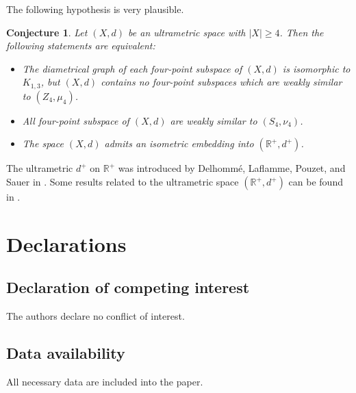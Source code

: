 \documentclass[11pt]{article}
\newtheorem{conjecture}[theorem]{Conjecture}
\theoremstyle{definition}
\theoremstyle{remark}
\numberwithin{equation}{section}
\begin{document}
The following hypothesis is very plausible. 



\begin{conjecture}
    \label{gdgnij}
    Let $(X,d)$ be an   ultrametric space with $|X|\geq 4$. Then the following statements are equivalent:

\begin{itemize}[left=10pt]
    \item[(i)] The diametrical graph of each four-point subspace of $(X,d)$ is isomorphic to $K_{1,3}$, but
$(X,d)$ contains no four-point subspaces which are weakly similar to $(Z_4,\mu_4)$.

\item[(ii)] All four-point subspace of $(X,d)$ are weakly similar to $(S_4,\nu_4)$.

    
\item[(iii)] The space $(X,d)$ admits an isometric embedding into $(\mathbb R^+,d^+)$.
    \end{itemize}
\end{conjecture}




The ultrametric $d^+$ on $\mathbb{R}^+$ was introduced by Delhommé, Laflamme, Pouzet, and Sauer in \cite{DLPS2008TaiA}.
Some results related to the ultrametric space $ (\mathbb{R}^+, d^+) $ can be found in \cite{DK2024JMS,Dov2025Arx,Dov2024UPFAME,Isha2023,Isha2021,Isha2023-1}.






\section*{Declarations}

\subsection*{Declaration of competing interest}

 The authors declare no conflict of interest.


\subsection*{Data availability}


 All necessary data are included into the paper.
\end{document}
